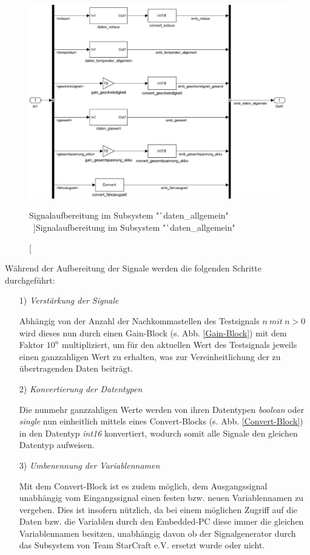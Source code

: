 \documentclass[fontsize = 12pt, paper = a4]{scrreprt}
\begin{document}
\begin{figure}[h]
\centering
\includegraphics[scale = 0.70]{collallgemein}
\caption[Signalaufbereitung im Subsystem "`daten\_allgemein" \ ]{Signalaufbereitung im Subsystem "`daten\_allgemein" \ }
\label{Signalaufbereitung_allg}
\end{figure} 

\newpage


Während der Aufbereitung der Signale werden die folgenden Schritte durchgeführt:

\begin{itemize}

\item[1)] \textit{Verstärkung der Signale}

Abhängig von der Anzahl der Nachkommastellen des Testsignals $n\ mit\ n>0$ wird dieses nun durch einen Gain-Block (s. Abb. \ref{Gain-Block}) mit dem Faktor $10^n$ multipliziert, um für den aktuellen Wert des Testsignals jeweils einen ganzzahligen Wert zu erhalten, was zur Vereinheitlichung der zu übertragenden Daten beiträgt.

\item[2)] \textit{Konvertierung der Datentypen}

Die nunmehr ganzzahligen Werte werden von ihren Datentypen \textit{boolean} oder \textit{single} nun einheitlich mittels eines Convert-Blocks (s. Abb. \ref{Convert-Block}) in den Datentyp \textit{int16} konvertiert, wodurch somit alle Signale den gleichen Datentyp aufweisen.  

\item[3)] \textit{Umbenennung der Variablennamen}

Mit dem Convert-Block ist es zudem möglich, dem Ausgangssignal unabhängig vom Eingangssignal einen festen bzw. neuen Variablennamen zu vergeben. Dies ist insofern nützlich, da bei einem möglichen Zugriff auf die Daten bzw. die Variablen durch den Embedded-PC diese immer die gleichen Variablennamen besitzen, unabhängig davon ob der Signalgenerator durch das Subsystem von Team StarCraft e.V. ersetzt wurde oder nicht.

\end{itemize}  
\end{document}
